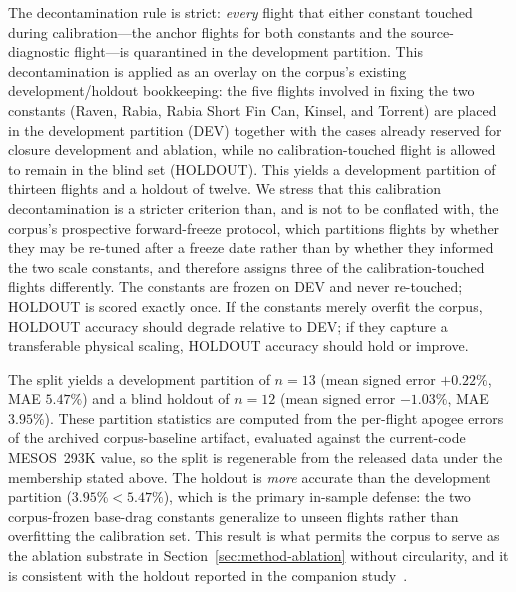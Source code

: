 The decontamination rule is strict: \emph{every} flight that either constant
touched during calibration---the anchor flights for both constants and the
source-diagnostic flight---is quarantined in the development partition. This
decontamination is applied as an overlay on the corpus's existing
development/holdout bookkeeping: the five flights involved in fixing the two
constants (Raven, Rabia, Rabia Short Fin Can, Kinsel, and Torrent) are placed in
the development partition (DEV) together with the cases already reserved for
closure development and ablation, while no calibration-touched flight is allowed
to remain in the blind set (HOLDOUT). This yields a development partition of
thirteen flights and a holdout of twelve. We stress that this calibration
decontamination is a stricter criterion than, and is not to be conflated with,
the corpus's prospective forward-freeze protocol, which partitions flights by
whether they may be re-tuned after a freeze date rather than by whether they
informed the two scale constants, and therefore assigns three of the
calibration-touched flights differently. The constants are frozen on DEV and
never re-touched; HOLDOUT is scored exactly once. If the constants merely overfit
the corpus, HOLDOUT accuracy should degrade relative to DEV; if they capture a
transferable physical scaling, HOLDOUT accuracy should hold or improve.

The split yields a development partition of $n=13$ (mean signed error $+0.22\%$,
MAE $5.47\%$) and a blind holdout of $n=12$ (mean signed error $-1.03\%$, MAE
$3.95\%$). These partition statistics are computed from the per-flight apogee
errors of the archived corpus-baseline artifact, evaluated against the
current-code MESOS~293K value, so the split is regenerable from the released data
under the membership stated above. The holdout is \emph{more} accurate than the
development partition ($3.95\% < 5.47\%$), which is the primary in-sample defense:
the two corpus-frozen base-drag constants generalize to unseen flights rather than
overfitting the calibration set. This result is what permits the corpus to serve
as the ablation substrate in Section~\ref{sec:method-ablation} without
circularity, and it is consistent with the holdout reported in the companion
study~\cite{yu2026jsr}.
